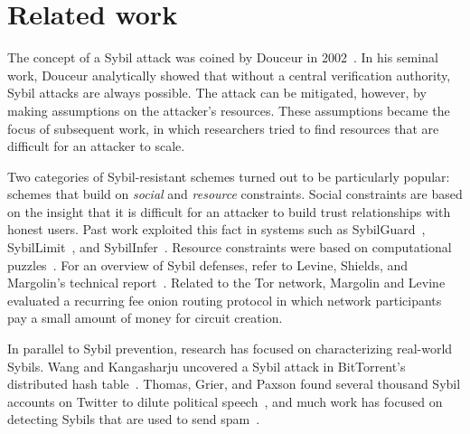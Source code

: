\section{Related work}
\label{sec:related_work}
The concept of a Sybil attack was coined by Douceur in 2002~\cite{Douceur2002a}.
In his seminal work, Douceur analytically showed that without a central
verification authority, Sybil attacks are always possible.  The attack can be
mitigated, however, by making assumptions on the attacker's resources.  These
assumptions became the focus of subsequent work, in which researchers tried to
find resources that are difficult for an attacker to scale.

Two categories of Sybil-resistant schemes turned out to be particularly popular:
schemes that build on \emph{social} and \emph{resource} constraints.  Social
constraints are based on the insight that it is difficult for an attacker to
build trust relationships with honest users.  Past work exploited this fact in
systems such as SybilGuard~\cite{Yu2006a}, SybilLimit~\cite{Yu2008a}, and
SybilInfer~\cite{Danezis2009a}.  Resource constraints were based on
computational puzzles~\cite{Borisov2006a,Li2012a}.  For an overview of Sybil
defenses, refer to Levine, Shields, and Margolin's technical
report~\cite{Levine2006a}.  Related to the Tor network, Margolin and
Levine~\cite{Margolin2008a} evaluated a recurring fee onion routing protocol in
which network participants pay a small amount of money for circuit creation.

In parallel to Sybil prevention, research has focused on characterizing
real-world Sybils.  Wang and Kangasharju uncovered a Sybil attack in
BitTorrent's distributed hash table~\cite{Wang2012a}.  Thomas, Grier, and Paxson
found several thousand Sybil accounts on Twitter to dilute political
speech~\cite{Thomas2012a}, and much work has focused on detecting Sybils that
are used to send spam~\cite{Gao2010a}.

